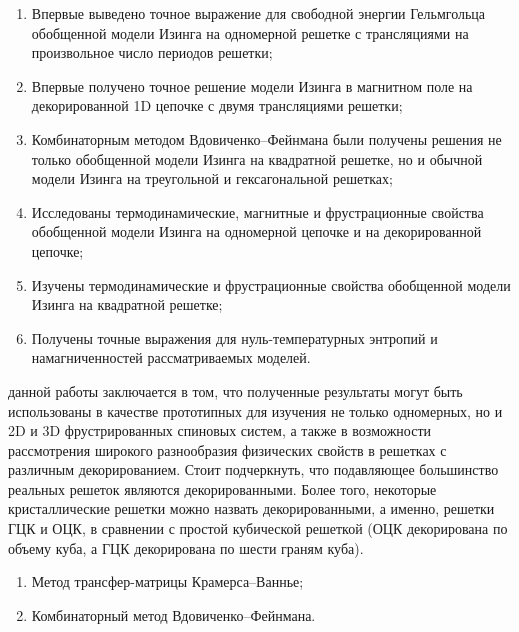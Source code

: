 {\novelty}
\begin{enumerate}[beginpenalty=10000] %
  \item Впервые выведено точное выражение для свободной энергии Гельмгольца обобщенной модели Изинга на одномерной решетке с трансляциями на произвольное число периодов решетки;
  \item Впервые получено точное решение модели Изинга в магнитном поле на декорированной 1D цепочке с двумя трансляциями решетки;
  \item Комбинаторным методом Вдовиченко--Фейнмана были получены решения не только обобщенной модели Изинга на квадратной решетке, но и обычной модели Изинга на треугольной и гексагональной решетках;
  \item Исследованы термодинамические, магнитные и фрустрационные свойства обобщенной модели Изинга на одномерной цепочке и на декорированной цепочке;
  \item Изучены термодинамические и фрустрационные свойства обобщенной модели Изинга на квадратной решетке;
  \item Получены точные выражения для нуль-температурных энтропий и намагниченностей рассматриваемых моделей.
\end{enumerate}

{\influence} данной работы заключается в том, что полученные результаты могут быть использованы в качестве прототипных для изучения не только одномерных, но и 2D и 3D фрустрированных спиновых систем, а также в возможности рассмотрения широкого разнообразия физических свойств в решетках с различным декорированием. Стоит подчеркнуть, что подавляющее большинство реальных решеток являются декорированными. Более того, некоторые кристаллические решетки можно назвать декорированными, а именно, решетки ГЦК и ОЦК, в сравнении с простой кубической решеткой (ОЦК декорирована по объему куба, а ГЦК декорирована по шести граням куба).

{\methods}
\begin{enumerate}[beginpenalty=10000] 
  \item Метод трансфер-матрицы Крамерса--Ваннье;
  \item Комбинаторный метод Вдовиченко--Фейнмана.
\end{enumerate}

